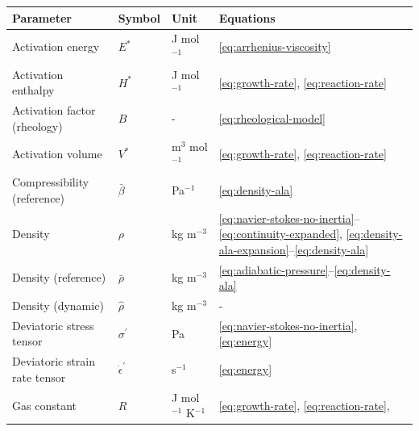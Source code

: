 \documentclass[
  paper=a4,
  ,captions=tableheading
]{scrartcl}
\newcounter{none}
\begin{document}
{\def\LTcaptype{none} %
\begin{longtable}[]{@{}
  >{\raggedright\arraybackslash}p{}
  >{\raggedright\arraybackslash}p{}
  >{\raggedright\arraybackslash}p{}
  >{\raggedright\arraybackslash}p{}@{}}
\toprule\noalign{}
\begin{minipage}[b]{\linewidth}\raggedright
Parameter
\end{minipage} & \begin{minipage}[b]{\linewidth}\raggedright
Symbol
\end{minipage} & \begin{minipage}[b]{\linewidth}\raggedright
Unit
\end{minipage} & \begin{minipage}[b]{\linewidth}\raggedright
Equations
\end{minipage} \\
\midrule\noalign{}
\endhead
\bottomrule\noalign{}
\endlastfoot
Activation energy & \(E^{\ast}\) & J mol\(^{-1}\) &
\ref{eq:arrhenius-viscosity} \\
Activation enthalpy & \(H^{\ast}\) & J mol\(^{-1}\) &
\ref{eq:growth-rate}, \ref{eq:reaction-rate} \\
Activation factor (rheology) & \(B\) & - & \ref{eq:rheological-model} \\
Activation volume & \(V^{\ast}\) & m\(^3\) mol\(^{-1}\) &
\ref{eq:growth-rate}, \ref{eq:reaction-rate} \\
Compressibility (reference) & \(\bar{\beta}\) & Pa\(^{-1}\) &
\ref{eq:density-ala} \\
Density & \(\rho\) & kg m\(^{-3}\) &
\ref{eq:navier-stokes-no-inertia}--\ref{eq:continuity-expanded},
\ref{eq:density-ala-expansion}--\ref{eq:density-ala} \\
Density (reference) & \(\bar{\rho}\) & kg m\(^{-3}\) &
\ref{eq:adiabatic-pressure}--\ref{eq:density-ala} \\
Density (dynamic) & \(\hat{\rho}\) & kg m\(^{-3}\) & - \\
Deviatoric stress tensor & \(\sigma^{\prime}\) & Pa &
\ref{eq:navier-stokes-no-inertia}, \ref{eq:energy} \\
Deviatoric strain rate tensor & \(\dot{\epsilon}^{\prime}\) & s\(^{-1}\)
& \ref{eq:energy} \\
Gas constant & \(R\) & J mol\(^{-1}\) K\(^{-1}\) & \ref{eq:growth-rate},
\ref{eq:reaction-rate},

\end{longtable}}
\end{document}
